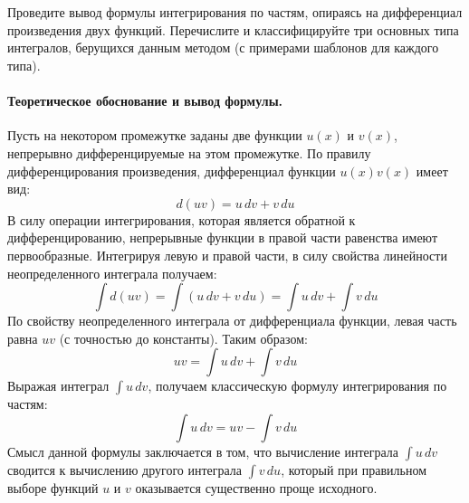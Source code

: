 \clearpage
\section*{}

{Проведите вывод формулы интегрирования по частям, опираясь на дифференциал произведения двух функций. Перечислите и классифицируйте три основных типа интегралов, берущихся данным методом (с примерами шаблонов для каждого типа).}

\paragraph{Теоретическое обоснование и вывод формулы.}
Пусть на некотором промежутке заданы две функции $u(x)$ и $v(x)$, непрерывно дифференцируемые на этом промежутке. По правилу дифференцирования произведения, дифференциал функции $u(x)v(x)$ имеет вид:
$$ d(uv) = u \, dv + v \, du $$
В силу операции интегрирования, которая является обратной к дифференцированию, непрерывные функции в правой части равенства имеют первообразные. Интегрируя левую и правой части, в силу свойства линейности неопределенного интеграла получаем:
$$ \int d(uv) = \int (u \, dv + v \, du) = \int u \, dv + \int v \, du $$
По свойству неопределенного интеграла от дифференциала функции, левая часть равна $uv$ (с точностью до константы). Таким образом:
$$ uv = \int u \, dv + \int v \, du $$
Выражая интеграл $\int u \, dv$, получаем классическую формулу интегрирования по частям:
$$ \int u \, dv = uv - \int v \, du $$
Смысл данной формулы заключается в том, что вычисление интеграла $\int u \, dv$ сводится к вычислению другого интеграла $\int v \, du$, который при правильном выборе функций $u$ и $v$ оказывается существенно проще исходного.


